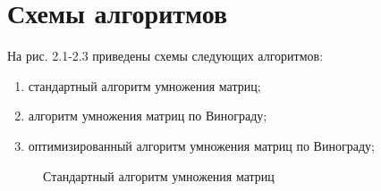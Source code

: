 \documentclass[12pt]{report}
\begin{document}
\section{Схемы алгоритмов}
На рис. 2.1-2.3 приведены схемы следующих алгоритмов:
\begin{enumerate}
	\item стандартный алгоритм умножения матриц;
	\item алгоритм умножения матриц по Винограду;
	\item оптимизированный алгоритм умножения матриц по Винограду;
\end{enumerate}

\newpage
\begin{figure}[h]
	\caption{Стандартный алгоритм умножения матриц}
	\label{figure:image}
\end{figure}
\end{document}
